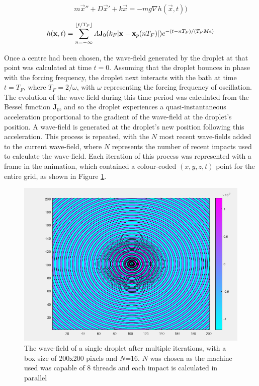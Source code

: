 \begin{equation}
m \vec{x}'' + D\vec{x}' + k\vec{x} = -mg\nabla h(\vec{x},t)
\label{equ:MATLABPilotWave})
\end{equation}

\begin{equation}
h(\mathbf{x},t) = \sum_{n=-\infty}^{\lfloor t/T_F\rfloor} A \mathbf{J}_0(k_F |\mathbf{x}-\mathbf{x}_p(nT_F)|) e^{-(t-nT_F)/(T_F Me)}
\label{equ:MATLABWaveHeight}
\end{equation}

Once a centre had been chosen, the wave-field generated by the droplet at that point was calculated at time $t=0$. Assuming that the droplet bounces in phase with the forcing frequency, the droplet next interacts with the bath at time $t=T_F$, where $T_F = 2/\omega$, with $\omega$ representing the forcing frequency of oscillation. The evolution of the wave-field during this time period was calculated from the Bessel function $\mathbf{J}_0$, and so the droplet experiences a quasi-instantaneous acceleration proportional to the gradient of the wave-field at the droplet's position. A wave-field is generated at the droplet's new position following this acceleration. This process is repeated, with the $N$ most recent wave-fields added to the current wave-field, where $N$ represents the number of recent impacts used to calculate the wave-field. Each iteration of this process was represented with a frame in the animation, which contained a colour-coded $(x,y,z,t)$ point for the entire grid, as shown in Figure \ref{fig:MATLABMaths}.
\begin{figure}
\centering
\includegraphics[width=\textwidth]{simulation/matlab.png}
\caption{The wave-field of a single droplet after multiple iterations, with a box size of 200x200 pixels and $N$=16. $N$ was chosen as the machine used was capable of 8 threads and each impact is calculated in parallel}
\label{fig:MATLABMaths}
\end{figure}

